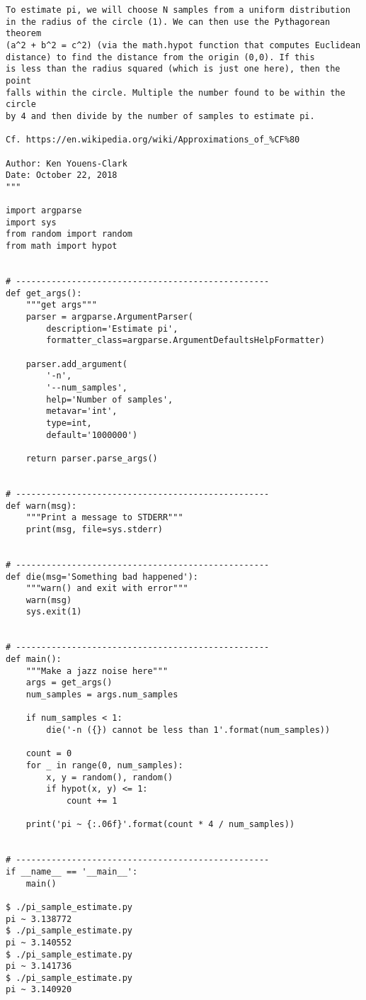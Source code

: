 \documentclass[10pt]{article}
\begin{document}
\begin{itemize}
\begin{verbatim}
To estimate pi, we will choose N samples from a uniform distribution
in the radius of the circle (1). We can then use the Pythagorean theorem
(a^2 + b^2 = c^2) (via the math.hypot function that computes Euclidean
distance) to find the distance from the origin (0,0). If this
is less than the radius squared (which is just one here), then the point
falls within the circle. Multiple the number found to be within the circle
by 4 and then divide by the number of samples to estimate pi.

Cf. https://en.wikipedia.org/wiki/Approximations_of_%CF%80

Author: Ken Youens-Clark
Date: October 22, 2018
"""

import argparse
import sys
from random import random
from math import hypot


# --------------------------------------------------
def get_args():
    """get args"""
    parser = argparse.ArgumentParser(
        description='Estimate pi',
        formatter_class=argparse.ArgumentDefaultsHelpFormatter)

    parser.add_argument(
        '-n',
        '--num_samples',
        help='Number of samples',
        metavar='int',
        type=int,
        default='1000000')

    return parser.parse_args()


# --------------------------------------------------
def warn(msg):
    """Print a message to STDERR"""
    print(msg, file=sys.stderr)


# --------------------------------------------------
def die(msg='Something bad happened'):
    """warn() and exit with error"""
    warn(msg)
    sys.exit(1)


# --------------------------------------------------
def main():
    """Make a jazz noise here"""
    args = get_args()
    num_samples = args.num_samples

    if num_samples < 1:
        die('-n ({}) cannot be less than 1'.format(num_samples))

    count = 0
    for _ in range(0, num_samples):
        x, y = random(), random()
        if hypot(x, y) <= 1:
            count += 1

    print('pi ~ {:.06f}'.format(count * 4 / num_samples))


# --------------------------------------------------
if __name__ == '__main__':
    main()
    
$ ./pi_sample_estimate.py
pi ~ 3.138772
$ ./pi_sample_estimate.py
pi ~ 3.140552
$ ./pi_sample_estimate.py
pi ~ 3.141736
$ ./pi_sample_estimate.py
pi ~ 3.140920
\end{verbatim}



\end{itemize}
\end{document}
